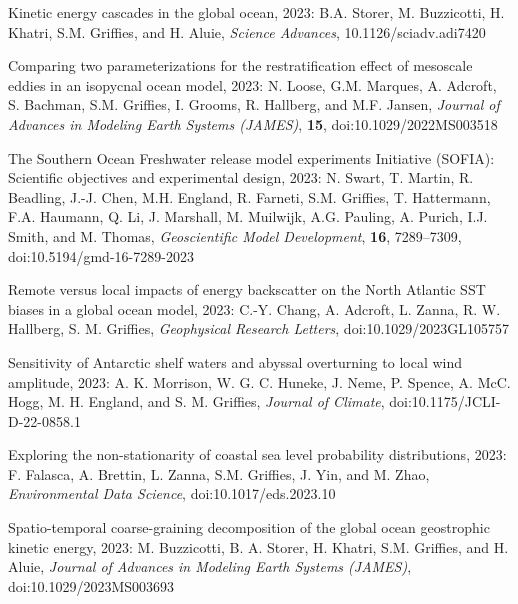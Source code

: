 \begin{etaremune}
\item Kinetic energy cascades in the global ocean, 2023: B.A. Storer, M. Buzzicotti, H. Khatri, S.M. Grif\/f\/ies, and H. Aluie,  {\it Science Advances}, 10.1126/sciadv.adi7420

\item Comparing two parameterizations for the restratification effect of mesoscale eddies in an isopycnal ocean model, 2023: N. Loose, G.M. Marques, A. Adcroft, S. Bachman, S.M. Grif\/f\/ies, I. Grooms, R. Hallberg, and M.F. Jansen, {\it Journal of Advances in Modeling Earth Systems (JAMES)}, {\bf 15}, doi:10.1029/2022MS003518

\item The Southern Ocean Freshwater release model experiments Initiative (SOFIA): Scientific objectives and experimental design, 2023: N. Swart, T. Martin, R. Beadling, J.-J. Chen, M.H. England, R. Farneti, S.M. Grif\/f\/ies, T. Hattermann, F.A. Haumann, Q. Li, J. Marshall, M. Muilwijk, A.G. Pauling, A. Purich, I.J. Smith, and M. Thomas,  {\it Geoscientific Model Development}, {\bf 16}, 7289–7309, doi:10.5194/gmd-16-7289-2023





\item Remote versus local impacts of energy backscatter on the North Atlantic SST biases in a global ocean model, 2023: C.-Y. Chang,  A. Adcroft, L. Zanna, R. W. Hallberg, S. M. Grif\/f\/ies, {\it  Geophysical Research Letters}, doi:10.1029/2023GL105757

\item Sensitivity of Antarctic shelf waters and abyssal overturning to local wind amplitude, 2023: A. K. Morrison, W. G. C. Huneke, J. Neme, P. Spence, A. McC. Hogg, M. H. England, and S. M. Grif\/f\/ies, {\it Journal of Climate}, doi:10.1175/JCLI-D-22-0858.1

\item Exploring the non-stationarity of coastal sea level probability distributions, 2023: F. Falasca, A. Brettin, L. Zanna, S.M. Grif\/f\/ies, J. Yin, and M. Zhao, {\it Environmental Data Science}, doi:10.1017/eds.2023.10

\item Spatio-temporal coarse-graining decomposition of the global ocean geostrophic kinetic energy, 2023:  M. Buzzicotti, B. A. Storer, H. Khatri, S.M. Grif\/f\/ies, and H. Aluie, {\it Journal of Advances in Modeling Earth Systems (JAMES)},
doi:10.1029/2023MS003693


\end{etaremune}
